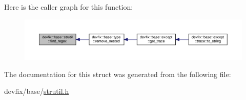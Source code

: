 Here is the caller graph for this function\+:
\nopagebreak
\begin{figure}[H]
\begin{center}
\leavevmode
\includegraphics[width=350pt]{structdevfix_1_1base_1_1strutil_abfee738c1d6577d38eddeaf3e652c50e_icgraph}
\end{center}
\end{figure}


The documentation for this struct was generated from the following file\+:\begin{DoxyCompactItemize}
\item 
devfix/base/\hyperlink{strutil_8h}{strutil.\+h}\end{DoxyCompactItemize}
